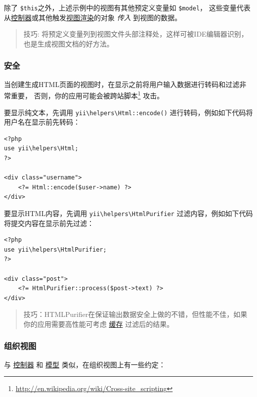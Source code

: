除了 \lstinline|$this|之外，上述示例中的视图有其他预定义变量如 \lstinline|$model|，
这些变量代表从\hyperref[structure-controllers.md]{控制器}或其他触发\hyperref[structure-views.md::::rendering-views]{视图渲染}的对象 \textit{传入} 到视图的数据。

\begin{quote}技巧: 将预定义变量列到视图文件头部注释处，这样可被IDE编辑器识别，也是生成视图文档的好方法。

\end{quote}
\subsubsection{安全 \label{structure-views.md::security}}
当创建生成HTML页面的视图时，在显示之前将用户输入数据进行转码和过滤非常重要，
否则，你的应用可能会被跨站脚本\footnote{\url{http://en.wikipedia.org/wiki/Cross-site\_scripting}} 攻击。

要显示纯文本，先调用 \texttt{yii{\allowbreak{}\textbackslash}helpers{\allowbreak{}\textbackslash}Html\allowbreak{}::\allowbreak{}encode()} 进行转码，例如如下代码将用户名在显示前先转码：

\lstset{language=php}\begin{lstlisting}
<?php
use yii\helpers\Html;
?>

<div class="username">
    <?= Html::encode($user->name) ?>
</div>
\end{lstlisting}
要显示HTML内容，先调用 \texttt{yii{\allowbreak{}\textbackslash}helpers{\allowbreak{}\textbackslash}HtmlPurifier} 过滤内容，例如如下代码将提交内容在显示前先过滤：

\lstset{language=php}\begin{lstlisting}
<?php
use yii\helpers\HtmlPurifier;
?>

<div class="post">
    <?= HtmlPurifier::process($post->text) ?>
</div>
\end{lstlisting}
\begin{quote}技巧：HTMLPurifier在保证输出数据安全上做的不错，但性能不佳，如果你的应用需要高性能可考虑
  \hyperref[caching-overview.md]{缓存} 过滤后的结果。

\end{quote}
\subsubsection{组织视图 \label{structure-views.md::organizing-views}}
与 \hyperref[structure-controllers.md]{控制器} 和 \hyperref[structure-models.md]{模型} 类似，在组织视图上有一些约定：

